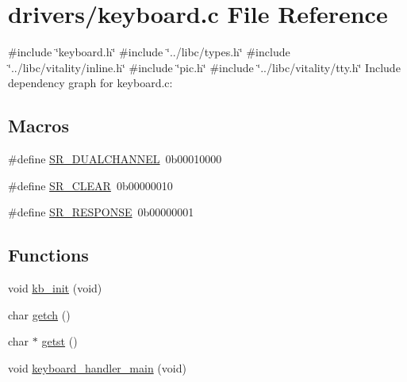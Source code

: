 \hypertarget{a00038}{}\section{drivers/keyboard.c File Reference}
\label{a00038}
{\ttfamily \#include \char`\"{}keyboard.\+h\char`\"{}}\newline
{\ttfamily \#include \char`\"{}../libc/types.\+h\char`\"{}}\newline
{\ttfamily \#include \char`\"{}../libc/vitality/inline.\+h\char`\"{}}\newline
{\ttfamily \#include \char`\"{}pic.\+h\char`\"{}}\newline
{\ttfamily \#include \char`\"{}../libc/vitality/tty.\+h\char`\"{}}\newline
Include dependency graph for keyboard.\+c\+:
\subsection*{Macros}
\begin{DoxyCompactItemize}
\item 
\#define \hyperlink{a00038_addafe32b109f94a57ae4bf1a1dca05e0_addafe32b109f94a57ae4bf1a1dca05e0}{S\+R\+\_\+\+D\+U\+A\+L\+C\+H\+A\+N\+N\+EL}~0b00010000
\item 
\#define \hyperlink{a00038_a8aa66e8bc828742fb4819d7cd2df598d_a8aa66e8bc828742fb4819d7cd2df598d}{S\+R\+\_\+\+C\+L\+E\+AR}~0b00000010
\item 
\#define \hyperlink{a00038_ac9efa716f8185bae296975136b510c30_ac9efa716f8185bae296975136b510c30}{S\+R\+\_\+\+R\+E\+S\+P\+O\+N\+SE}~0b00000001
\end{DoxyCompactItemize}
\subsection*{Functions}
\begin{DoxyCompactItemize}
\item 
void \hyperlink{a00038_aabdb223e5290f3b3c07bc82d075b87d7_aabdb223e5290f3b3c07bc82d075b87d7}{kb\+\_\+init} (void)
\item 
char \hyperlink{a00038_af3facad10e05defa48d45b46eb9ebe7e_af3facad10e05defa48d45b46eb9ebe7e}{getch} ()
\item 
char $\ast$ \hyperlink{a00038_ab88a2e96bbe585e228a5b201435c0240_ab88a2e96bbe585e228a5b201435c0240}{getst} ()
\item 
void \hyperlink{a00038_a1db933be72a0547c4070ba55e6697ba2_a1db933be72a0547c4070ba55e6697ba2}{keyboard\+\_\+handler\+\_\+main} (void)
\end{DoxyCompactItemize}
